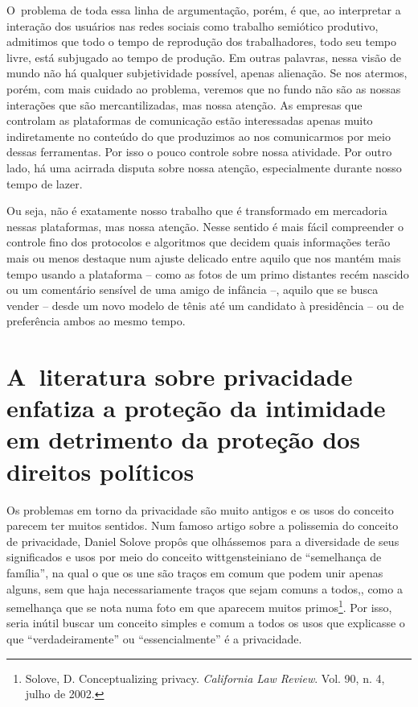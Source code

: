 O~problema de toda essa linha de argumentação, porém, é que, ao
interpretar a interação dos usuários nas redes sociais como trabalho
semiótico produtivo, admitimos que todo o tempo de reprodução dos
trabalhadores, todo seu tempo livre, está subjugado ao tempo de
produção. Em outras palavras, nessa visão de mundo não há qualquer
subjetividade possível, apenas alienação. Se nos atermos, porém, com
mais cuidado ao problema, veremos que no fundo não são as nossas
interações que são mercantilizadas, mas nossa atenção. As empresas que
controlam as plataformas de comunicação estão interessadas apenas muito
indiretamente no conteúdo do que produzimos ao nos comunicarmos por meio
dessas ferramentas. Por isso o pouco controle sobre nossa atividade. Por
outro lado, há uma acirrada disputa sobre nossa atenção, especialmente
durante nosso tempo de lazer.

Ou seja, não é exatamente nosso trabalho que é transformado em
mercadoria nessas plataformas, mas nossa atenção. Nesse sentido é mais
fácil compreender o controle fino dos protocolos e algoritmos que
decidem quais informações terão mais ou menos destaque num ajuste
delicado entre aquilo que nos mantém mais tempo usando a plataforma --
como as fotos de um primo distantes recém nascido ou um comentário
sensível de uma amigo de infância --, aquilo que se busca vender -- desde
um novo modelo de tênis até um candidato à presidência -- ou de
preferência ambos ao mesmo tempo.

\section{A~literatura sobre privacidade enfatiza a proteção da intimidade
em detrimento da proteção dos direitos políticos}

Os problemas em torno da privacidade são muito antigos e os usos do
conceito parecem ter muitos sentidos. Num famoso artigo sobre a
polissemia do conceito de privacidade, Daniel Solove propôs que
olhássemos para a diversidade de seus significados e usos por meio do
conceito wittgensteiniano de ``semelhança de família'', na qual o que os
une são traços em comum que podem unir apenas alguns, sem que haja
necessariamente traços que sejam comuns a todos,, como a semelhança que
se nota numa foto em que aparecem muitos primos\footnote{Solove,
  D. Conceptualizing privacy. \emph{California Law Review}. Vol. 90, n.
  4, julho de 2002.}. Por isso, seria inútil buscar um conceito simples
e comum a todos os usos que explicasse o que ``verdadeiramente'' ou
``essencialmente'' é a privacidade.

